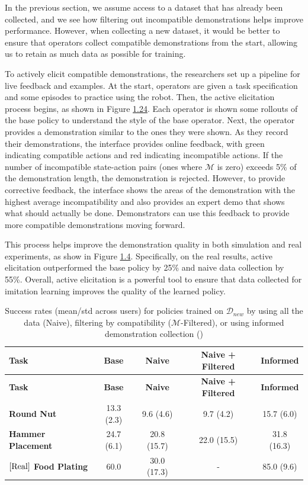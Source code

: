 \documentclass[
  letterpaper,
  DIV=11,
  numbers=noendperiod,
  oneside]{scrreprt}
\theoremstyle{remark}
\begin{document}
In the previous section, we assume access to a dataset that has already
been collected, and we see how filtering out incompatible demonstrations
helps improve performance. However, when collecting a new dataset, it
would be better to ensure that operators collect compatible
demonstrations from the start, allowing us to retain as much data as
possible for training.

To actively elicit compatible demonstrations, the researchers set up a
pipeline for live feedback and examples. At the start, operators are
given a task specification and some episodes to practice using the
robot. Then, the active elicitation process begins, as shown in Figure
\hyperref[fig:active_elicitation]{1.24}. Each operator is shown some
rollouts of the base policy to understand the style of the base
operator. Next, the operator provides a demonstration similar to the
ones they were shown. As they record their demonstrations, the interface
provides online feedback, with green indicating compatible actions and
red indicating incompatible actions. If the number of incompatible
state-action pairs (ones where \(\mathcal{M}\) is zero) exceeds 5\% of
the demonstration length, the demonstration is rejected. However, to
provide corrective feedback, the interface shows the areas of the
demonstration with the highest average incompatibility and also provides
an expert demo that shows what should actually be done. Demonstrators
can use this feedback to provide more compatible demonstrations moving
forward.

This process helps improve the demonstration quality in both simulation
and real experiments, as show in Figure
\hyperref[fig:active_elicitation_results]{1.4}. Specifically, on the
real results, active elicitation outperformed the base policy by 25\%
and naive data collection by 55\%. Overall, active elicitation is a
powerful tool to ensure that data collected for imitation learning
improves the quality of the learned policy.

\label{fig:active_elicitation_results}
\begin{longtable}[]{@{}lcccc@{}}
\caption{Success rates (mean/std across users) for policies trained on
\(\mathcal{D}_{new}\) by using all the data (Naive), filtering by
compatibility (\(\mathcal{M}\)-Filtered), or using informed
demonstration collection ()}\tabularnewline
\toprule\noalign{}
\textbf{Task} & \textbf{Base} & \textbf{Naive} & \textbf{Naive +
Filtered} & \textbf{Informed} \\
\midrule\noalign{}
\endfirsthead
\toprule\noalign{}
\textbf{Task} & \textbf{Base} & \textbf{Naive} & \textbf{Naive +
Filtered} & \textbf{Informed} \\
\midrule\noalign{}
\endhead
\bottomrule\noalign{}
\endlastfoot
\textbf{Round Nut} & 13.3 (2.3) & 9.6 (4.6) & 9.7 (4.2) & 15.7 (6.0) \\
\textbf{Hammer Placement} & 24.7 (6.1) & 20.8 (15.7) & 22.0 (15.5) &
31.8 (16.3) \\
\textbf{\(\left[ \textup{Real} \right]\) Food Plating} & 60.0 & 30.0
(17.3) & - & 85.0 (9.6) \\
\end{longtable}
\end{document}
